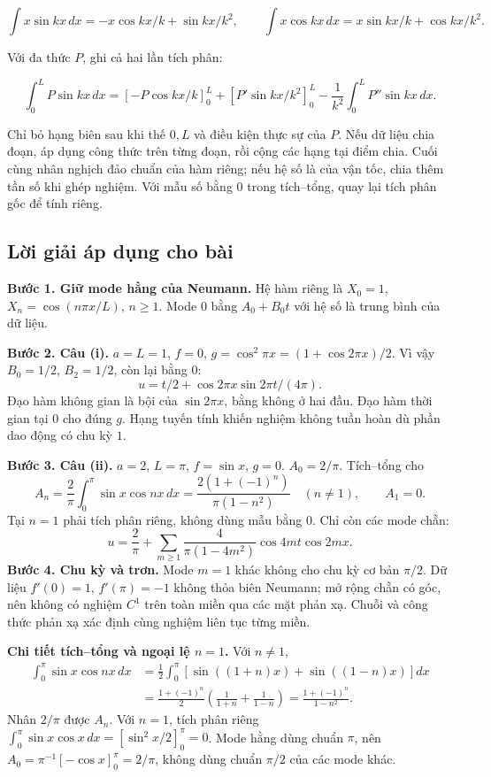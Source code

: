 \documentclass[10pt,a4paper]{article}
\begin{document}
\[
\int x\sin kx\,dx=-x\cos kx/k+\sin kx/k^2,\qquad
\int x\cos kx\,dx=x\sin kx/k+\cos kx/k^2.
\]


Với đa thức $P$, ghi cả hai lần tích phân:


\[
\int_0^L P\sin kx\,dx
=\left[-P\cos kx/k\right]_0^L+
\left[P'\sin kx/k^2\right]_0^L-
\frac1{k^2}\int_0^L P''\sin kx\,dx.
\]


Chỉ bỏ hạng biên sau khi thế $0,L$ và điều kiện thực sự của $P$. Nếu dữ liệu chia đoạn, áp dụng công thức trên từng đoạn, rồi cộng các hạng tại điểm chia. Cuối cùng nhân nghịch đảo chuẩn của hàm riêng; nếu hệ số là của vận tốc, chia thêm tần số khi ghép nghiệm. Với mẫu số bằng $0$ trong tích–tổng, quay lại tích phân gốc để tính riêng.
\subsection*{Lời giải áp dụng cho bài}
\textbf{Bước 1. Giữ mode hằng của Neumann.} Hệ hàm riêng là $X_0=1$, $X_n=\cos(n\pi x/L)$, $n\ge1$. Mode $0$ bằng $A_0+B_0t$ với hệ số là trung bình của dữ liệu.

\textbf{Bước 2. Câu (i).} $a=L=1$, $f=0$, $g=\cos^2\pi x=(1+\cos2\pi x)/2$. Vì vậy $B_0=1/2$, $B_2=1/2$, còn lại bằng $0$:
\[u=t/2+\cos2\pi x\sin2\pi t/(4\pi).\]
Đạo hàm không gian là bội của $\sin2\pi x$, bằng không ở hai đầu. Đạo hàm thời gian tại $0$ cho đúng $g$. Hạng tuyến tính khiến nghiệm không tuần hoàn dù phần dao động có chu kỳ $1$.

\textbf{Bước 3. Câu (ii).} $a=2$, $L=\pi$, $f=\sin x$, $g=0$. $A_0=2/\pi$. Tích–tổng cho
\[A_n=\frac2\pi\int_0^\pi\sin x\cos nx\,dx
=\frac{2(1+(-1)^n)}{\pi(1-n^2)}\quad(n\ne1),\qquad A_1=0.\]
Tại $n=1$ phải tích phân riêng, không dùng mẫu bằng $0$. Chỉ còn các mode chẵn:
\[u=\frac2\pi+\sum_{m\ge1}\frac4{\pi(1-4m^2)}\cos4mt\cos2mx.\]
\textbf{Bước 4. Chu kỳ và trơn.} Mode $m=1$ khác không cho chu kỳ cơ bản $\pi/2$. Dữ liệu $f'(0)=1$, $f'(\pi)=-1$ không thỏa biên Neumann; mở rộng chẵn có góc, nên không có nghiệm $C^1$ trên toàn miền qua các mặt phản xạ. Chuỗi và công thức phản xạ xác định cùng nghiệm liên tục từng miền.

\textbf{Chi tiết tích–tổng và ngoại lệ $n=1$.} Với $n\ne1$,
\[\begin{aligned}
\int_0^\pi\sin x\cos nx\,dx
&=\frac12\int_0^\pi[\sin((1+n)x)+\sin((1-n)x)]dx\\
&=\frac{1+(-1)^n}{2}\left(\frac1{1+n}+\frac1{1-n}\right)
=\frac{1+(-1)^n}{1-n^2}.
\end{aligned}\]
Nhân $2/\pi$ được $A_n$. Với $n=1$, tích phân riêng $\int_0^\pi\sin x\cos x\,dx=[\sin^2x/2]_0^\pi=0$. Mode hằng dùng chuẩn $\pi$, nên $A_0=\pi^{-1}[-\cos x]_0^\pi=2/\pi$, không dùng chuẩn $\pi/2$ của các mode khác.
\end{document}

